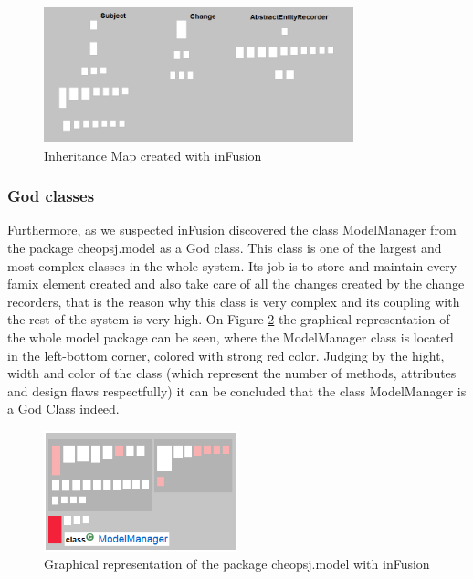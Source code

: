 \documentclass[a4paper]{article}
\begin{document}
\begin{figure}[h]
\centering
\includegraphics[width=0.8\textwidth]{Images/inheritanceMap}
\caption{Inheritance Map created with inFusion}
\label{fig:inheritanceMap}
\end{figure}

\subsubsection{God classes}
Furthermore, as we suspected inFusion discovered the class ModelManager from the package cheopsj.model as a God class. This class is one of the largest and most complex classes in the whole system. Its job is to store and maintain every famix element created and also take care of all the changes created by the change recorders, that is the reason why this class is very complex and its coupling with the rest of the system is very high. On Figure \ref{fig:godClassMM} the graphical representation of the whole model package can be seen, where the ModelManager class is located in the left-bottom corner, colored with strong red color. Judging by the hight, width and color of the class (which represent the number of methods, attributes and design flaws respectfully) it can be concluded that the class ModelManager is a God Class indeed.

\begin{figure}[h]
\centering
\includegraphics[width=0.5\textwidth]{Images/GodClassMM}
\caption{Graphical representation of the package cheopsj.model with inFusion}
\label{fig:godClassMM}
\end{figure}
\end{document}
